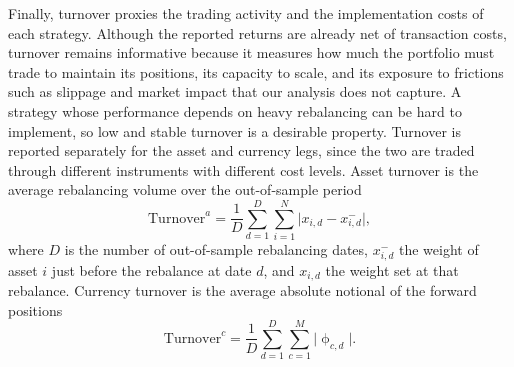 Finally, turnover proxies the trading activity and the implementation
costs of each strategy. Although the reported returns are already net of
transaction costs, turnover remains informative because it
measures how much the portfolio must trade to maintain its positions, its capacity to scale, and its exposure to frictions such as slippage and market impact that our analysis does not capture. A strategy whose performance depends on heavy rebalancing can be hard to implement, so low and stable turnover is a desirable property. Turnover is reported separately for the asset and currency legs,
since the two are traded through different instruments with different cost levels.
Asset turnover is the average rebalancing volume over the out-of-sample period
\begin{equation*}
\mathrm{Turnover}^{a} = \frac{1}{D}\sum_{d=1}^{D}\sum_{i=1}^{N}
\bigl| x_{i,d} - x_{i,d}^{-} \bigr|,
\end{equation*}
where $D$ is the number of out-of-sample rebalancing dates, $x_{i,d}^{-}$ the weight of
asset $i$ just before the rebalance at date $d$, and $x_{i,d}$ the weight set at that
rebalance. Currency turnover is the average absolute notional of the
forward positions
\begin{equation}
\mathrm{Turnover}^{c} = \frac{1}{D}\sum_{d=1}^{D}\sum_{c=1}^{M}
\bigl| \upphi_{c,d} \bigr|. \label{eq:currency-turnover} 
\end{equation}
